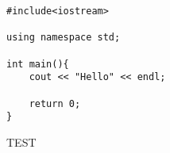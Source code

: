 \documentclass[11pt]{article}
\begin{document}
    \begin{verbatim}
#include<iostream>

using namespace std;

int main(){
    cout << "Hello" << endl;

    return 0;
}
    \end{verbatim}
    TEST\cite{TEST}
    
    
\end{document}
